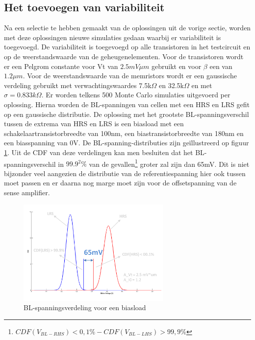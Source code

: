 \subsection{Het toevoegen van variabiliteit}\label{sec:varload}
Na een selectie te hebben gemaakt van de oplossingen uit de vorige sectie, worden met deze oplossingen nieuwe simulaties gedaan waarbij er variabiliteit is toegevoegd. De variabiliteit is toegevoegd op alle transistoren in het testcircuit en op de weerstandswaarde van de geheugenelementen. Voor de transistoren wordt er een Pelgrom constante voor Vt van $2.5mV\mu m$ gebruikt en voor $\beta$ een van $1.2\mu m$\cite{ppt:variatie}. Voor de weerstandswaarde van de memristors wordt er een gaussische verdeling gebruikt met verwachtingswaardes 7.5k$\Omega$ en 32.5k$\Omega$ en met $\sigma = 0.833k\Omega$. Er worden telkens 500 Monte Carlo simulaties uitgevoerd per oplossing. Hierna worden de BL-spanningen van cellen met een HRS en LRS gefit op een gaussische distributie. De oplossing met het grootste BL-spanningsverschil tussen de extrema van HRS en LRS is een biasload met een schakelaartransistorbreedte van 100nm, een biastransistorbreedte van 180nm en een biasspanning van 0V. De BL-spanning-distributies zijn geïllustreerd op figuur \ref{fig:distbias}. Uit de CDF van deze verdelingen kan men besluiten dat het BL-spanningsverschil in $99.9^2\%$ van de gevallen\footnote{$CDF(V_{BL-RHS})<0,1\%-CDF(V_{BL-LHS})>99,9\%$} groter zal zijn dan 65mV. Dit is niet bijzonder veel aangezien de distributie van de referentiespanning hier ook tussen moet passen en er daarna nog marge moet zijn voor de offsetspanning van de sense amplifier. 

\begin{figure}[!ht]
  \centering
  \includegraphics[width=0.67\textwidth]{../fig/hfdst-last-var1.png}
  \caption{BL-spanningsverdeling voor een biasload}
  \label{fig:distbias}
\end{figure}

